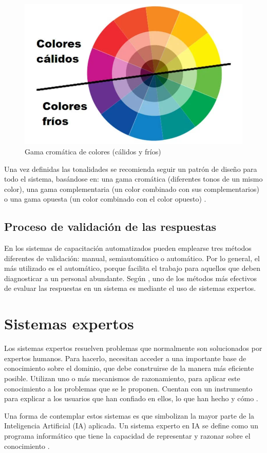 \begin{figure}[h]
\centering
 \includegraphics[width=0.6\linewidth]{imagen/gama.png}
 \caption{Gama cromática de colores (cálidos y fríos)}
 \label{fig:colores} 
\end{figure}

Una vez definidas las tonalidades se recomienda seguir un patrón de diseño para todo el sistema, basándose en: una gama cromática (diferentes tonos de un mismo color), una gama complementaria (un color combinado con sus complementarios) o una gama opuesta (un color combinado con el color opuesto) \cite{TerronLopez2022}.

\subsection{Proceso de validación de las respuestas}
En los sistemas de capacitación automatizados pueden emplearse tres métodos diferentes de validación: manual, semiautomático o automático. Por lo general, el más utilizado es el automático, porque facilita el trabajo para aquellos que deben diagnosticar a un personal abundante. Según \cite{AltyJames1984}, uno de los métodos más efectivos de evaluar las respuestas en un sistema es mediante el uso de sistemas expertos.

\section{Sistemas expertos}
Los sistemas expertos resuelven problemas que normalmente son solucionados por expertos humanos. Para hacerlo, necesitan acceder a una importante base de conocimiento sobre el dominio, que debe construirse de la manera más eficiente posible. Utilizan uno o más mecanismos de razonamiento, para aplicar este conocimiento a los problemas que se le proponen. Cuentan con un instrumento para explicar a los usuarios que han confiado en ellos, lo que han hecho y cómo \cite{VonRueden2021}.

Una forma de contemplar estos sistemas es que simbolizan la mayor parte de la Inteligencia Artificial (IA) aplicada. Un sistema experto en IA se define como un programa informático que tiene la capacidad de representar y razonar sobre el conocimiento \cite{Rasheed2021}.

